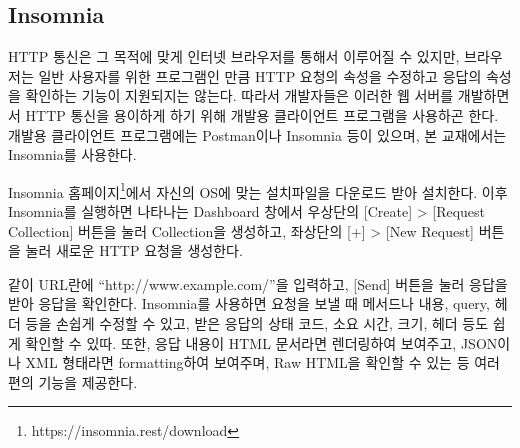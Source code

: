 \subsection*{Insomnia}

HTTP 통신은 그 목적에 맞게 인터넷 브라우저를 통해서 이루어질 수 있지만, 브라우저는 일반 사용자를 위한 프로그램인 만큼 HTTP 요청의 속성을 수정하고 응답의 속성을 확인하는 기능이 지원되지는 않는다. 따라서 개발자들은 이러한 웹 서버를 개발하면서 HTTP 통신을 용이하게 하기 위해 개발용 클라이언트 프로그램을 사용하곤 한다. 개발용 클라이언트 프로그램에는 Postman이나 Insomnia 등이 있으며, 본 교재에서는 Insomnia를 사용한다.

Insomnia 홈페이지\footnote{https://insomnia.rest/download}에서 자신의 OS에 맞는 설치파일을 다운로드 받아 설치한다. 이후 Insomnia를 실행하면 나타나는 Dashboard 창에서 우상단의 [Create] \textgreater{} [Request Collection] 버튼을 눌러 Collection을 생성하고, 좌상단의 [+] \textgreater{} [New Request] 버튼을 눌러 새로운 HTTP 요청을 생성한다.

    {}

\와 같이 URL란에 ``http://www.example.com/''을 입력하고, [Send] 버튼을 눌러 응답을 받아 응답을 확인한다. Insomnia를 사용하면 요청을 보낼 때 메서드나 내용, query, 헤더 등을 손쉽게 수정할 수 있고, 받은 응답의 상태 코드, 소요 시간, 크기, 헤더 등도 쉽게 확인할 수 있따. 또한, 응답 내용이 HTML 문서라면 렌더링하여 보여주고, JSON이나 XML 형태라면 formatting하여 보여주며, Raw HTML을 확인할 수 있는 등 여러 편의 기능을 제공한다.
